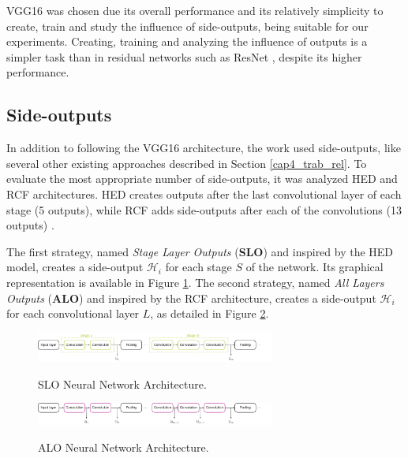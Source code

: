 VGG16 was chosen due its overall performance and its relatively simplicity to create, train and study the influence of side-outputs, being suitable for our experiments. 
Creating, training and analyzing the influence of outputs is a simpler task than in residual networks such as ResNet \cite{RESNET:2016:7780459}, despite its higher performance.

\subsection{Side-outputs}
\label{cap5_saidas_laterais}

In addition to following the VGG16 architecture, the work used side-outputs, like several other existing approaches described in Section \ref{cap4_trab_rel}.
To evaluate the most appropriate number of side-outputs, it was analyzed HED and RCF architectures.
HED creates outputs after the last convolutional layer of each stage (5 outputs), while RCF adds side-outputs after each of the convolutions (13 outputs) \cite{HED:2015} \cite{RCF:2017:8100105}.

The first strategy, named \textit{Stage Layer Outputs} (\textbf{SLO}) and inspired by the HED model, creates a side-output $\mathcal{H}_i$ for each stage $S$ of the network.
Its graphical representation is available in Figure \ref{fig:architecture_slo}.
The second strategy, named \textit{All Layers Outputs} (\textbf{ALO}) and inspired by the RCF architecture, creates a side-output $\mathcal{H}_i$ for each convolutional layer $L$, as detailed in Figure \ref{fig:architecture_alo}.

\begin{figure}
  \centering
  \caption{SLO Neural Network Architecture.}
  \includegraphics[width=0.7\textwidth]{../imagens/ilustracoes/cap6_arquitetura_slo.png}
  \sourceOwn
  \label{fig:architecture_slo}
\end{figure}

\begin{figure}
  \centering
  \caption{ALO Neural Network Architecture.}
  \includegraphics[width=0.7\textwidth]{../imagens/ilustracoes/cap6_arquitetura_alo.png}
  \sourceOwn
  \label{fig:architecture_alo}
\end{figure}


